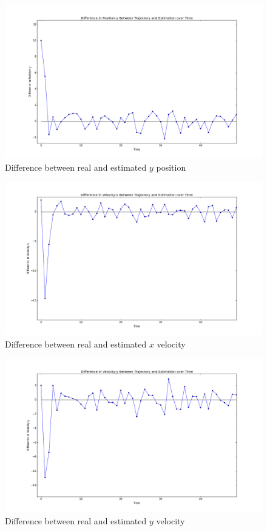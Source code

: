 \documentclass[12pt]{article}
\begin{document}
	\begin{figure}[H]
		\centering
		\includegraphics[width=\textwidth]{Diffpy}
		\caption{Difference between real and estimated $y$ position}
	\end{figure}

	\begin{figure}[H]
		\centering
		\includegraphics[width=\textwidth]{Diffvx}
		\caption{Difference between real and estimated $x$ velocity}
	\end{figure}

	\begin{figure}[H]
		\centering
		\includegraphics[width=\textwidth]{Diffvy}
		\caption{Difference between real and estimated $y$ velocity}
	\end{figure}
\end{document}
